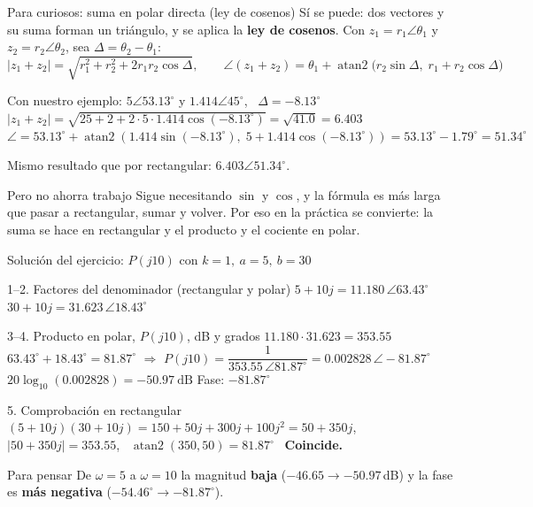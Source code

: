 \documentclass[aspectratio=169,11pt]{beamer}
\newcommand{\ang}[1]{\angle #1^\circ}
\begin{document}
\begin{frame}{Para curiosos: suma en polar directa (ley de cosenos)}
  \small
  \setlength{\parskip}{2pt}
  Sí se puede: dos vectores y su suma forman un triángulo, y se aplica la \textbf{ley de cosenos}. Con $z_1=r_1\angle\theta_1$ y $z_2=r_2\angle\theta_2$, sea $\Delta=\theta_2-\theta_1$:
  \[
    |z_1+z_2|=\sqrt{r_1^2+r_2^2+2r_1r_2\cos\Delta},
    \qquad
    \angle(z_1+z_2)=\theta_1+\operatorname{atan2}\!\big(r_2\sin\Delta,\; r_1+r_2\cos\Delta\big)
  \]
  \begin{block}{Con nuestro ejemplo: $5\angle53.13^\circ$ y $1.414\angle45^\circ$, \ $\Delta=-8.13^\circ$}
    $|z_1+z_2|=\sqrt{25+2+2\cdot5\cdot1.414\cos(-8.13^\circ)}=\sqrt{41.0}=6.403$\\
    $\angle=53.13^\circ+\operatorname{atan2}(1.414\sin(-8.13^\circ),\;5+1.414\cos(-8.13^\circ))=53.13^\circ-1.79^\circ=51.34^\circ$
  \end{block}
  Mismo resultado que por rectangular: $6.403\angle51.34^\circ$.

  \begin{alertblock}{Pero no ahorra trabajo}
    Sigue necesitando $\sin$ y $\cos$, y la fórmula es más larga que pasar a rectangular, sumar y volver. Por eso en la práctica se convierte: la suma se hace en rectangular y el producto y el cociente en polar.
  \end{alertblock}
\end{frame}



\begin{frame}{Solución del ejercicio: $P(j10)$ con $k=1,\ a=5,\ b=30$}
  \footnotesize
  \setlength{\parskip}{1pt}
  \begin{block}{1--2. Factores del denominador (rectangular y polar)}
    $5+10j=11.180\,\ang{63.43}$ \qquad $30+10j=31.623\,\ang{18.43}$
  \end{block}
  \begin{block}{3--4. Producto en polar, $P(j10)$, dB y grados}
    $11.180\cdot31.623=353.55$ \quad $63.43^\circ+18.43^\circ=81.87^\circ$ \quad $\Rightarrow$ \quad $P(j10)=\dfrac{1}{353.55\,\ang{81.87}}=0.002828\,\ang{-81.87}$\\
    $20\log_{10}(0.002828)=\boxed{-50.97\ \text{dB}}$ \qquad Fase: $\boxed{-81.87^\circ}$
  \end{block}
  \begin{block}{5. Comprobación en rectangular}
    $(5+10j)(30+10j)=150+50j+300j+100j^2=50+350j$, \ $|50+350j|=353.55$, \ $\operatorname{atan2}(350,50)=81.87^\circ$ \ \textbf{Coincide.}
  \end{block}
  \begin{alertblock}{Para pensar}
    De $\omega=5$ a $\omega=10$ la magnitud \textbf{baja} ($-46.65\to-50.97$\,dB) y la fase es \textbf{más negativa} ($-54.46^\circ\to-81.87^\circ$).
  \end{alertblock}
\end{frame}
\end{document}
